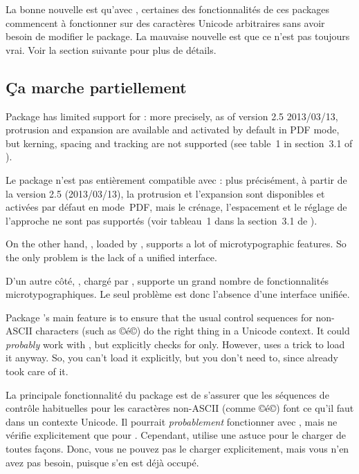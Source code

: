 \documentclass{lltxdoc}
\begin{document}
La bonne nouvelle est qu'avec \lualatex, certaines des fonctionnalités de ces packages
commencent à fonctionner sur des caractères Unicode arbitraires sans avoir besoin de
modifier le package. La mauvaise nouvelle est que ce n'est pas toujours vrai.
Voir la section suivante pour plus de détails.

\subsection{Ça marche partiellement}\label{partial}

Package  has limited support for \luatex: more precisely, as of
version 2.5 2013/03/13, protrusion and expansion are available and activated
by default in PDF mode, but kerning, spacing and tracking are not supported
(see table~1 in section~3.1 of ).

Le package  n'est pas entièrement compatible avec \luatex: plus précisément, à partir de la version 2.5 (2013/03/13), la protrusion et l'expansion sont disponibles et activées par défaut en mode~PDF, mais le crénage, l'espacement et le réglage de l'approche ne sont pas supportés (voir tableau~1 dans la section~3.1 de ).

On the other hand, , loaded by , supports a lot of
microtypographic features. So the only problem is the lack of a unified
interface.

D'un autre côté, , chargé par , supporte un grand nombre de fonctionnalités microtypographiques. Le seul problème est donc l'absence d'une interface unifiée.

Package 's main feature is to ensure that the usual control
sequences for non-ASCII characters (such as ©\'e©) do the right thing in a
Unicode context. It could \emph{probably} work with \luatex, but explicitly
checks for \xetex only. However,  uses a trick to load it anyway.
So, you can't load it explicitly, but you don't need to, since 
already took care of it.

La principale fonctionnalité du package  est de s'assurer que les séquences de contrôle habituelles pour les caractères non-ASCII (comme ©\'e©) font ce qu'il faut dans un contexte Unicode. Il pourrait \emph{probablement} fonctionner avec \luatex, mais ne vérifie explicitement que pour \xetex. Cependant,  utilise une astuce pour le charger de toutes façons. Donc, vous ne pouvez pas le charger explicitement, mais vous n'en avez pas besoin, puisque  s'en est déjà occupé.
\end{document}
